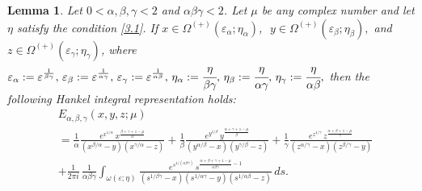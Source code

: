 \documentclass[12pt, reqno]{amsart}
\newtheorem{lemma}[theorem]{Lemma}
\theoremstyle{definition}
\theoremstyle{remark}
\numberwithin{equation}{section}
\begin{document}
\begin{lemma}\label{l3.2}
     Let $0 < \alpha, \beta,\gamma < 2$ and $\alpha\beta\gamma < 2$. Let $\mu$ be any complex number and let $\eta$ satisfy the condition \eqref{3.1}.
If
$
x \in \Omega^{(+)}({\varepsilon}_\alpha;\eta_\alpha)
$,\,\, 
$y \in \Omega^{(+)}({\varepsilon}_\beta;\eta_\beta),
$ and $z \in \Omega^{(+)}({\varepsilon}_\gamma;\eta_\gamma)
$,
where
$
{\varepsilon}_\alpha:={\varepsilon}^{\frac{1}{\beta\gamma}},\,
{\varepsilon}_\beta:={\varepsilon}^{\frac{1}{\alpha\gamma}}, \,{\varepsilon}_\gamma:={\varepsilon}^{\frac{1}{\alpha\beta}},\,
\eta_\alpha:=\cfrac{{\eta}}{\beta\gamma},\,
\eta_\beta:=\cfrac{{\eta}}{\alpha\gamma},\,
\eta_\gamma:=\cfrac{{\eta}}{\alpha\beta},
$
then the following Hankel integral representation holds:
\begin{equation}\label{3.9}\begin{aligned}
&E_{\alpha,\beta,\gamma}(x,y,z;\mu)\\
&=\frac{1}{\alpha}\frac{
e^{x^{1/\alpha}}
\,x^{\frac{\beta+\gamma+1-\mu}{\alpha}}}
{(x^{\beta/\alpha}-y)(x^{\gamma/\alpha}-z)}+\frac{1}{\beta}\frac{
e^{y^{1/\beta}}
\,y^{\frac{\alpha+\gamma+1-\mu}{\beta}}}
{(y^{\alpha/\beta}-x)(y^{\gamma/\beta}-z)}+\frac{1}{\gamma}
\frac{
e^{z^{1/\gamma}}
\,z^{\frac{\alpha+\beta+1-\mu}{\gamma}}}
{(z^{\alpha/\gamma}-x)(z^{\beta/\gamma}-y)}\\
&+
\frac{1}{2\pi i}\,
\frac{1}{\alpha\beta\gamma}
\int_{\omega(\varepsilon;\eta)}
\frac{
e^{s^{1/(\alpha\beta\gamma)}}
\,s^{\frac{\alpha+\beta+\gamma+1-\mu}{\alpha\beta\gamma}-1}
}
{
(s^{1/\beta\gamma}-x)(s^{1/\alpha\gamma}-y)(s^{1/\alpha\beta}-z)
}
\,ds.\end{aligned}
\end{equation}
\end{lemma}
\end{document}
